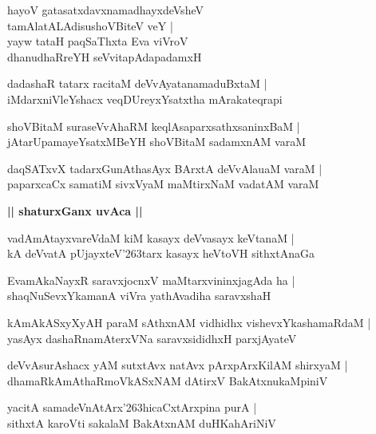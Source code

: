 \documentclass[twoside,12pt,openright]{book}
\def\S{\char'263}
\newcounter{shloka}[chapter]
\def\uvaca#1{\centerline{{\large\textbf{#1}}}}
\begin{document}
\begin{shloka}%
hayoV gatasatxdavxnamadhayxdeVsheV \\
tamAlatALAdisushoVBiteV veY |\\
yayw tataH paqSaThxta Eva viVroV \\
dhanudhaRreYH seVvitapAdapadamxH
\end{shloka}

\begin{shloka}%
dadashaR tatarx racitaM deVvAyatanamaduBxtaM |\\
iMdarxniVleYshacx veqDUreyxYsatxtha mArakateqrapi
\end{shloka}

\begin{shloka}%
shoVBitaM suraseVvAhaRM keqlAsaparxsathxsaninxBaM |\\
jAtarUpamayeYsatxMBeYH shoVBitaM sadamxnAM varaM 
\end{shloka}

\begin{shloka}%
daqSATxvX tadarxGunAthasAyx BArxtA deVvAlauaM varaM |\\
paparxcaCx samatiM sivxVyaM maMtirxNaM vadatAM varaM 
\end{shloka}

\uvaca{|| shaturxGanx uvAca ||}

\begin{shloka}%
vadAmAtayxvareVdaM kiM kasayx deVvasayx keVtanaM |\\
kA deVvatA pUjayxteV\S tarx kasayx heVtoVH sithxtAnaGa 
\end{shloka}

\begin{shloka}%
EvamAkaNayxR saravxjocnxV maMtarxvininxjagAda ha |\\
shaqNuSevxYkamanA viVra yathAvadiha saravxshaH 
\end{shloka}

\begin{shloka}%
kAmAkASxyXyAH paraM sAthxnAM vidhidhx vishevxYkashamaRdaM |\\
yasAyx dashaRnamAterxVNa saravxsididhxH parxjAyateV 
\end{shloka}

\begin{shloka}%
deVvAsurAshacx yAM sutxtAvx natAvx pArxpArxKilAM shirxyaM |\\
dhamaRkAmAthaRmoVkASxNAM dAtirxV BakAtxnukaMpiniV 
\end{shloka}

\begin{shloka}%
yacitA samadeVnAtArx\S hicaCxtArxpina purA |\\
sithxtA karoVti sakalaM BakAtxnAM duHKahAriNiV 
\end{shloka}
\end{document}

